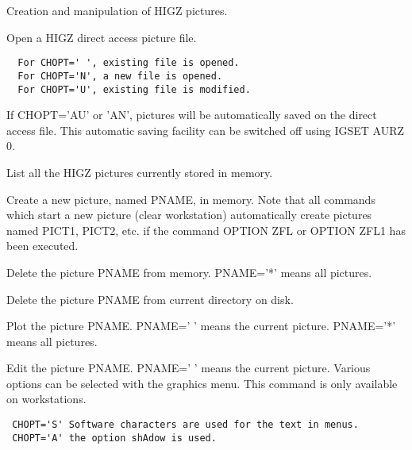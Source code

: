 \BEGTEXT
Creation and manipulation of HIGZ pictures.
\ENDTEXT

\BEGARG
{}
\ENDARG
\BEGTEXT
Open a HIGZ direct access picture file.
\begin{verbatim}
  For CHOPT=' ', existing file is opened.
  For CHOPT='N', a new file is opened.
  For CHOPT='U', existing file is modified.
\end{verbatim}
If CHOPT='AU' or 'AN', pictures will be automatically saved
on the direct access file. This automatic saving facility
can be switched off using IGSET AURZ 0.
\ENDTEXT

\BEGTEXT
List all the HIGZ pictures currently stored in memory.
\ENDTEXT

\BEGARG
{}
\ENDARG
\BEGTEXT
Create a new picture, named PNAME, in memory.
Note that all commands which start a new picture (clear workstation)
automatically create pictures named PICT1, PICT2, etc.
if the command OPTION ZFL or OPTION ZFL1 has been executed.
\ENDTEXT

\BEGARG
{}
\ENDARG
\BEGTEXT
Delete the picture PNAME from memory.
PNAME='*' means all pictures.
\ENDTEXT

\BEGARG
{}
\ENDARG
\BEGTEXT
Delete the picture PNAME from current directory on disk.
\ENDTEXT

\BEGARG
{}
\ENDARG
\BEGTEXT
Plot the picture PNAME.
PNAME=' ' means the current picture.
PNAME='*' means all pictures.
\ENDTEXT

\BEGARG
{}
\ENDARG
\BEGTEXT
Edit the picture PNAME.
PNAME=' ' means the current picture.
Various options can be selected with the graphics menu.
This command is only available on workstations.
\begin{verbatim}
 CHOPT='S' Software characters are used for the text in menus.
 CHOPT='A' the option shAdow is used.
\end{verbatim}
\ENDTEXT

